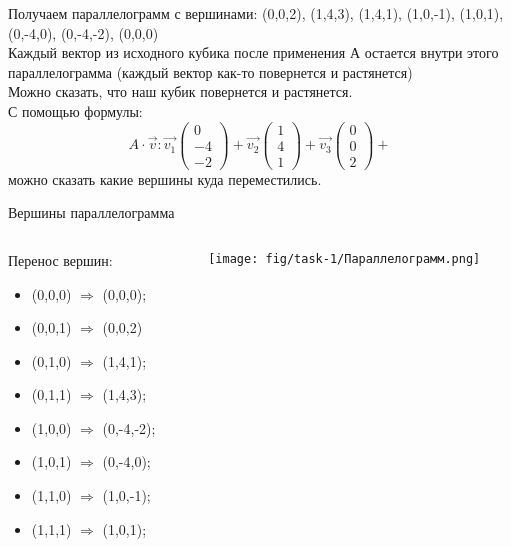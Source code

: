 
\begin{frame}
Получаем параллелограмм с вершинами: (0,0,2), (1,4,3), (1,4,1), (1,0,-1), (1,0,1), (0,-4,0), (0,-4,-2), (0,0,0)\\
Каждый вектор из исходного кубика после применения А остается внутри этого параллелограмма (каждый вектор как-то повернется и растянется)\\
Можно сказать, что наш кубик повернется и растянется. \\
С помощью формулы:
\[
A \cdot \vec{v}:
\vec{v_{1}}\left(\begin{array}{l}
    0 \\
    -4 \\
    -2
\end{array}\right) +
\vec{v_{2}}\left(\begin{array}{l}
    1 \\
    4 \\
    1
\end{array}\right) +
\vec{v_{3}}\left(\begin{array}{l}
    0 \\
    0 \\
    2
\end{array}\right) +
\]
можно сказать какие вершины куда переместились. 
\end{frame}


\begin{frame}{Вершины параллелограмма}
\begin{columns}
\begin{column}{0.4\paperwidth}
Перенос вершин:
\begin{itemize}
    \item (0,0,0) $\Rightarrow$ (0,0,0);
    \item (0,0,1) $\Rightarrow$ (0,0,2)
    \item (0,1,0) $\Rightarrow$ (1,4,1);
    \item (0,1,1) $\Rightarrow$ (1,4,3);
    \item (1,0,0) $\Rightarrow$ (0,-4,-2);
    \item (1,0,1) $\Rightarrow$ (0,-4,0);
    \item (1,1,0) $\Rightarrow$ (1,0,-1);
    \item (1,1,1) $\Rightarrow$ (1,0,1);
  \end{itemize}
\end{column}
\begin{column}{0.5\paperwidth}
\texttt{[image: fig/task-1/Параллелограмм.png]}
\end{column}
\end{columns}
\end{frame}

